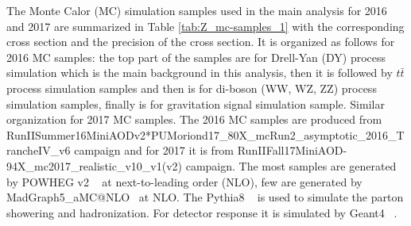 The Monte Calor (MC) simulation samples used in the main analysis for 2016 and 2017 are summarized in Table \ref{tab:Z_mc-samples_1} with the corresponding cross section and the precision of the cross section. It is organized as follows for 2016 MC samples: the top part of the samples are for Drell-Yan (DY) process simulation which is the main background in this analysis, then it is followed by $t\bar{t}$ process simulation samples and then is for di-boson (WW, WZ, ZZ) process simulation samples, finally is for gravitation signal simulation sample. Similar organization for 2017 MC samples. The 2016 MC samples are produced from RunIISummer16MiniAODv2*PUMoriond17\_80X\_mcRun2\_asymptotic\_2016\_TrancheIV\_v6 campaign and for 2017 it is from RunIIFall17MiniAOD-94X\_mc2017\_realistic\_v10\_v1(v2) campaign.
The most samples are generated by POWHEG v2 ~\cite{Nason:2004rx,Frixione:2007vw,Alioli:2010xd,Alioli:2008gx,Frixione:2007nw,Re:2010bp} at next-to-leading order (NLO), few are generated by MadGraph5\_aMC@NLO~\cite{MadGraph5} at NLO. The Pythia8 ~\cite{Sjostrand:2014zea} is used to simulate the parton showering and hadronization. For detector response it is simulated by Geant4 ~\cite{Agostinelli:2002hh}.


